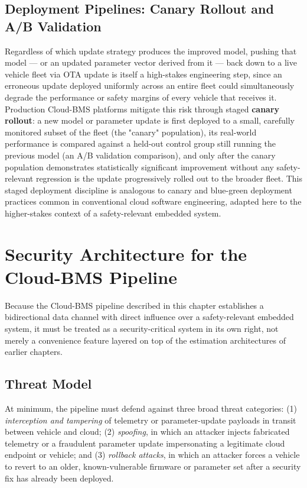 \subsection{Deployment Pipelines: Canary Rollout and A/B Validation}
\label{subsec:15_canary}

Regardless of which update strategy produces the improved model, pushing that model — or an updated parameter vector derived from it — back down to a live vehicle fleet via OTA update is itself a high-stakes engineering step, since an erroneous update deployed uniformly across an entire fleet could simultaneously degrade the performance or safety margins of every vehicle that receives it. Production Cloud-BMS platforms mitigate this risk through staged \textbf{canary rollout}: a new model or parameter update is first deployed to a small, carefully monitored subset of the fleet (the "canary" population), its real-world performance is compared against a held-out control group still running the previous model (an A/B validation comparison), and only after the canary population demonstrates statistically significant improvement without any safety-relevant regression is the update progressively rolled out to the broader fleet. This staged deployment discipline is analogous to canary and blue-green deployment practices common in conventional cloud software engineering, adapted here to the higher-stakes context of a safety-relevant embedded system.



\section{Security Architecture for the Cloud-BMS Pipeline}
\label{sec:15_security}

Because the Cloud-BMS pipeline described in this chapter establishes a bidirectional data channel with direct influence over a safety-relevant embedded system, it must be treated as a security-critical system in its own right, not merely a convenience feature layered on top of the estimation architectures of earlier chapters.

\subsection{Threat Model}
\label{subsec:15_threat_model}

At minimum, the pipeline must defend against three broad threat categories: (1) \emph{interception and tampering} of telemetry or parameter-update payloads in transit between vehicle and cloud; (2) \emph{spoofing}, in which an attacker injects fabricated telemetry or a fraudulent parameter update impersonating a legitimate cloud endpoint or vehicle; and (3) \emph{rollback attacks}, in which an attacker forces a vehicle to revert to an older, known-vulnerable firmware or parameter set after a security fix has already been deployed.

